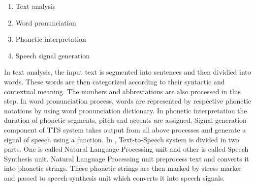 \begin{enumerate}
  \item Text analysis
  \item Word pronunciation
  \item Phonetic interpretation
  \item Speech signal generation
\end{enumerate}

In text analysis, the input text is segmented into sentences and then dividied into words.
These words are then categorized according to their syntactic and contextual meaning. The
numbers and abbreviations are also processed in this step. In word pronunciation process, words
are represented by respective phonetic notations by using word pronunciation dictionary. In
phonetic interpretation the duration of phonetic segments, pitch and accents are assigned. Signal
generation component of TTS system takes output from all above processes and generate a signal
of speech using a function. In \cite{urdu_text_preprocessing}, Text-to-Speech system is divided in
two parts. One is called Natural Language Processing unit and other is called Speech Synthesis
unit. Natural Language Processing unit preprocess text and converts it into phonetic strings. These
phonetic strings are then marked by stress marker and passed to speech synthesis unit which
converts it into speech signals.